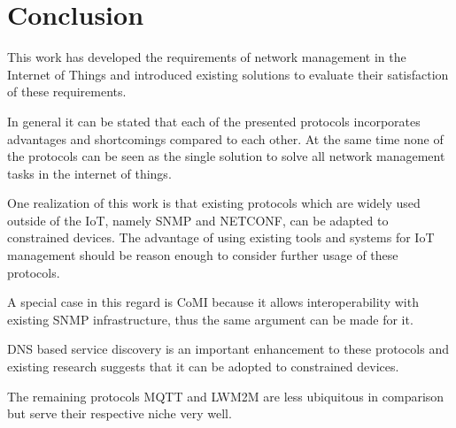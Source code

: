 \documentclass[conference]{IEEEtran}
\begin{document}



\section{Conclusion}

This work has developed the requirements of network management in the Internet of Things and introduced existing solutions to evaluate their satisfaction of these requirements.

In general it can be stated that each of the presented protocols incorporates advantages and shortcomings compared to each other. At the same time none of the protocols can be seen as the single solution to solve all network management tasks in the internet of things.

One realization of this work is that existing protocols which are widely used outside of the IoT, namely SNMP and NETCONF, can be adapted to constrained devices. The advantage of using existing tools and systems for IoT management should be reason enough to consider further usage of these protocols. 

A special case in this regard is CoMI because it allows interoperability with existing SNMP infrastructure, thus the same argument can be made for it.

DNS based service discovery is an important enhancement to these protocols and existing research suggests that it can be adopted to constrained devices.

The remaining protocols MQTT and LWM2M are less ubiquitous in comparison but serve their respective niche very well.









%





\end{document}
